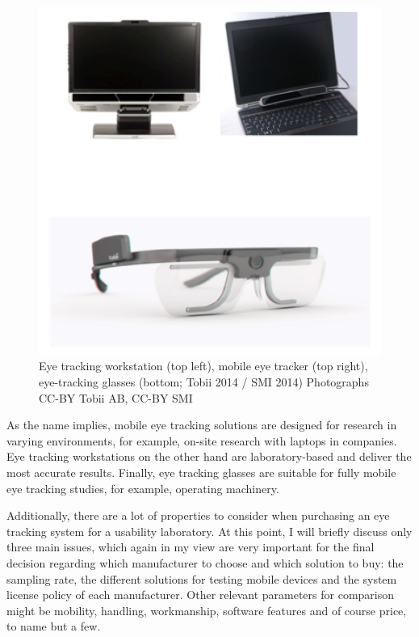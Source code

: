 \documentclass[output=paper]{langsci/langscibook}
\begin{document}
 
\begin{figure}[t]
 \includegraphics[width=\textwidth]{figures/Roesener3.png}
 \caption{Eye tracking workstation (top left), mobile eye tracker (top right), eye-tracking glasses (bottom; Tobii 2014 / SMI 2014) {\scriptsize Photographs CC-BY Tobii AB, CC-BY SMI}}
 \label{roesener:fig:3}
\end{figure} 


As the name implies, mobile eye tracking solutions are designed for research in varying environments, for example, on-site research with laptops in companies. Eye tracking workstations on the other hand are laboratory-based and deliver the most accurate results. Finally, eye tracking glasses are suitable for fully mobile eye tracking studies, for example, operating machinery.


Additionally, there are a lot of properties to consider when purchasing an eye tracking system for a usability laboratory. At this point, I will briefly discuss only three main issues, which again in my view are very important for the final decision regarding which manufacturer to choose and which solution to buy: the sampling rate, the different solutions for testing mobile devices and the system license policy of each manufacturer. Other relevant parameters for comparison might be mobility, handling, workmanship, software features and of course price, to name but a few. 
\end{document}
